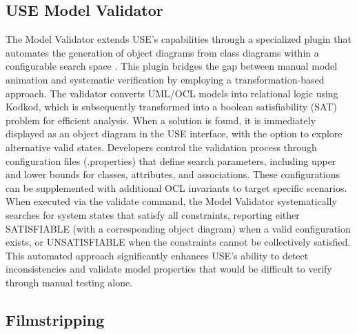 \subsection{USE Model Validator}
The Model Validator extends USE's capabilities through a specialized plugin that 
automates the generation of object diagrams from class diagrams within a configurable 
search space \cite{USE}. This plugin bridges the gap between manual model animation 
and systematic verification by employing a transformation-based approach. The 
validator converts UML/OCL models into relational logic using Kodkod, which is 
subsequently transformed into a boolean satisfiability (SAT) problem for efficient 
analysis. When a solution is found, it is immediately displayed as an object diagram 
in the USE interface, with the option to explore alternative valid states. Developers 
control the validation process through configuration files (.properties) that define 
search parameters, including upper and lower bounds for classes, attributes, and 
associations. These configurations can be supplemented with additional OCL invariants 
to target specific scenarios. When executed via the validate command, the Model 
Validator systematically searches for system states that satisfy all constraints, 
reporting either SATISFIABLE (with a corresponding object diagram) when a valid 
configuration exists, or UNSATISFIABLE when the constraints cannot be collectively 
satisfied. This automated approach significantly enhances USE's ability to detect 
inconsistencies and validate model properties that would be difficult to verify 
through manual testing alone.


\subsection{Filmstripping}
\label{subsec:filmstripping}
